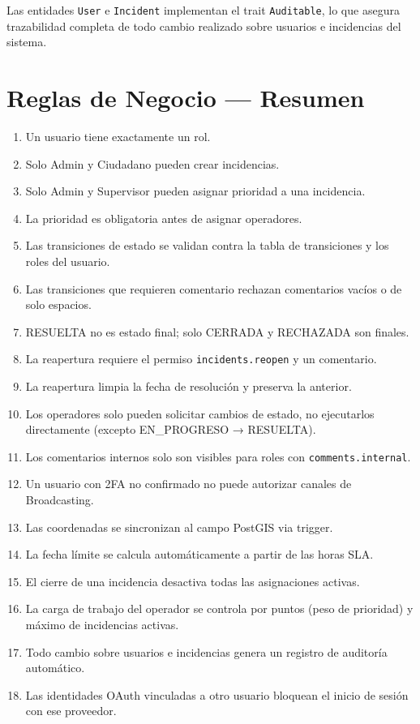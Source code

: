 \documentclass[11pt, a4paper]{article}
\begin{document}
\begin{nota}
Las entidades \texttt{User} e \texttt{Incident} implementan el trait \texttt{Auditable}, lo que asegura trazabilidad completa de todo cambio realizado sobre usuarios e incidencias del sistema.
\end{nota}


\section{Reglas de Negocio — Resumen}

\begin{enumerate}[label=\textbf{RN-\arabic*}, leftmargin=2.5cm]
  \item Un usuario tiene exactamente un rol.
  \item Solo Admin y Ciudadano pueden crear incidencias.
  \item Solo Admin y Supervisor pueden asignar prioridad a una incidencia.
  \item La prioridad es obligatoria antes de asignar operadores.
  \item Las transiciones de estado se validan contra la tabla de transiciones y los roles del usuario.
  \item Las transiciones que requieren comentario rechazan comentarios vacíos o de solo espacios.
  \item RESUELTA no es estado final; solo CERRADA y RECHAZADA son finales.
  \item La reapertura requiere el permiso \texttt{incidents.reopen} y un comentario.
  \item La reapertura limpia la fecha de resolución y preserva la anterior.
  \item Los operadores solo pueden solicitar cambios de estado, no ejecutarlos directamente (excepto EN\_PROGRESO → RESUELTA).
  \item Los comentarios internos solo son visibles para roles con \texttt{comments.internal}.
  \item Un usuario con 2FA no confirmado no puede autorizar canales de Broadcasting.
  \item Las coordenadas se sincronizan al campo PostGIS via trigger.
  \item La fecha límite se calcula automáticamente a partir de las horas SLA.
  \item El cierre de una incidencia desactiva todas las asignaciones activas.
  \item La carga de trabajo del operador se controla por puntos (peso de prioridad) y máximo de incidencias activas.
  \item Todo cambio sobre usuarios e incidencias genera un registro de auditoría automático.
  \item Las identidades OAuth vinculadas a otro usuario bloquean el inicio de sesión con ese proveedor.
\end{enumerate}
\end{document}
